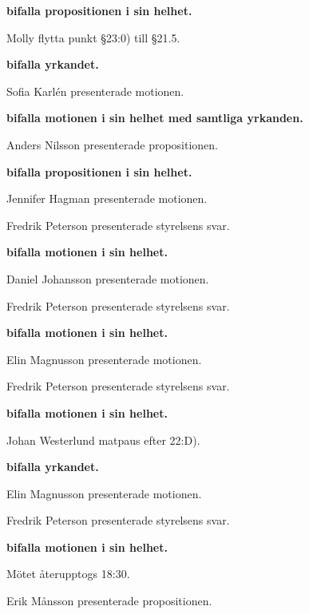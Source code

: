 \documentclass[10pt]{article}
\begin{document}
\begin{paragrafer}
\begin{paragrafer}
        \textbf{\Mba bifalla propositionen i sin helhet.}

        Molly \ypa flytta punkt \S23:0) till \S21.5.

        \textbf{\Mba bifalla yrkandet.}


    Sofia Karlén presenterade motionen.

    \textbf{\Mba bifalla motionen i sin helhet med samtliga yrkanden.}

\end{paragrafer}
    Anders Nilsson presenterade propositionen.

    \textbf{\Mba bifalla propositionen i sin helhet.}

    \begin{paragrafer}
      Jennifer Hagman presenterade motionen.

      Fredrik Peterson presenterade styrelsens svar.

      \textbf{\Mba bifalla motionen i sin helhet.}


      Daniel Johansson presenterade motionen.

      Fredrik Peterson presenterade styrelsens svar.

      \textbf{\Mba bifalla motionen i sin helhet.}

      Elin Magnusson presenterade motionen.

      Fredrik Peterson presenterade styrelsens svar.

      \textbf{\Mba bifalla motionen i sin helhet.}

      Johan Westerlund \ypa matpaus efter 22:D).

      \textbf{\Mba bifalla yrkandet.}

      Elin Magnusson presenterade motionen.

      Fredrik Peterson presenterade styrelsens svar.

      \textbf{\Mba bifalla motionen i sin helhet.}

      Mötet återupptogs 18:30.
  \end{paragrafer}
    \begin{paragrafer}
      Erik Månsson presenterade propositionen.


\end{paragrafer}
\end{paragrafer}
\end{document}
